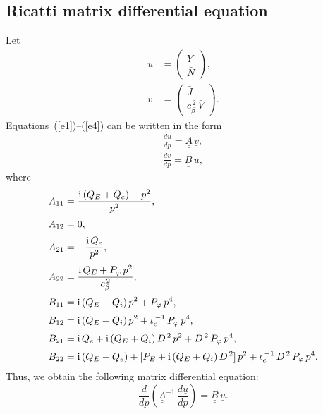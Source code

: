 \documentclass[12pt,prb,aps]{revtex4-1}
\begin{document}
\subsection{Ricatti matrix differential equation}
Let
\begin{align}
\underline{u}&= \left(\begin{array}{c}\bar{Y}\\\bar{N}\end{array}\right),\\[0.5ex]
\underline{v}&= \left(\begin{array}{c}\bar{J}\\c_\beta^{\,2}\,\bar{V}\end{array}\right).
\end{align}
Equations~(\ref{e1})--(\ref{e4}) can be written in the form 
\begin{align}
\frac{d\underline{u}}{dp}= \underline{\underline{A}}\,\underline{v},\\[0.5ex]
\frac{d\underline{v}}{dp}= \underline{\underline{B}}\,\underline{u},
\end{align}
where
\begin{align}
A_{11} &=  \frac{{\rm i}\,(Q_E+Q_e)+p^2}{p^2},\\[0.5ex]
A_{12}&=0,\\[0.5ex]
A_{21} &=- \frac{{\rm i}\,Q_e}{p^2},\\[0.5ex]
A_{22} &= \frac{{\rm i}\,Q_E + P_\varphi\,p^2}{c_\beta^{\,2}},\\[0.5ex]
B_{11} &= {\rm i}\,(Q_E+Q_i)\,p^2 + P_\varphi\,p^4,\\[0.5ex]
B_{12} &= {\rm i}\,(Q_E+Q_i)\,p^2 + \iota_e^{\,-1}\,P_\varphi\,p^4,\\[0.5ex]
B_{21}&= {\rm i}\,Q_e+ {\rm i}\,(Q_E+Q_i)\,D^{\,2}\,p^2 + D^{\,2}\,P_\varphi\,p^4,\\[0.5ex]
B_{22} & ={\rm i}\,(Q_E+Q_e) + [P_E + {\rm i}\,(Q_E +Q_i)\,D^{\,2}]\,p^2 + \iota_e^{\,-1}\,D^{\,2}\,P_\varphi\,p^4.
\end{align}
Thus, we obtain the following matrix differential equation: 
\begin{equation}\label{mat}
\frac{d}{dp}\!\left(\underline{\underline{A}}^{-1}\,\frac{d\underline{u}}{dp}\right) = \underline{\underline{B}}\,\underline{u}.
\end{equation}
\end{document}
